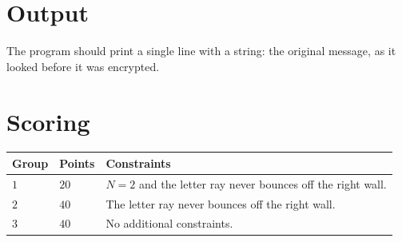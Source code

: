 \section*{Output}
The program should print a single line with a string: the original message, as it looked before it was encrypted.

\section*{Scoring}
\noindent
\begin{tabular}{| l | l | p{12cm} |}
  \hline
  \textbf{Group} & \textbf{Points} & \textbf{Constraints} \\ \hline
  $1$    & $20$       & $N=2$ and the letter ray never bounces off the right wall. \\ \hline
  $2$    & $40$       & The letter ray never bounces off the right wall. \\ \hline
  $3$    & $40$       & No additional constraints. \\ \hline
\end{tabular}
